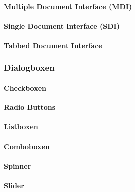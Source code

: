 \documentclass[a4paper, 11pt, accentcolor = tud3b]{tudreport}
\begin{document}
					\paragraph{Multiple Document Interface (MDI)} %

					\paragraph{Single Document Interface (SDI)} %

					\paragraph{Tabbed Document Interface} %

				\subsubsection{Dialogboxen} %

					\paragraph{Checkboxen} %

					\paragraph{Radio Buttons} %

					\paragraph{Listboxen} %

					\paragraph{Comboboxen} %

					\paragraph{Spinner} %

					\paragraph{Slider} %
\end{document}
